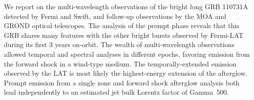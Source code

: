


\bigskip



\bigskip

\noindent We report on the multi-wavelength observations of the bright long GRB 110731A detected by Fermi and Swift, and follow-up observations by the MOA and GROND optical telescopes. The analysis of the prompt phase reveals that this GRB shares many features with the other bright bursts observed by Fermi-LAT during its first 3 years on-orbit. The wealth of multi-wavelength observations allowed
temporal and spectral analyses in different epochs, favoring emission from the forward shock in a wind-type medium. The temporally-extended emission observed by the LAT is most likely the highest-energy extension of the afterglow. Prompt emission from a single zone and forward shock afterglow analysis both lead independently to an estimated jet bulk Lorentz factor of Gamma~500.

